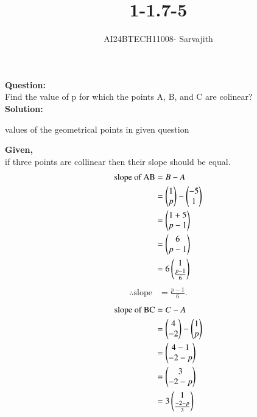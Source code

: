 \documentclass[journal]{IEEEtran}
\begin{document}

\vspace{3cm}

\title{1-1.7-5}
\author{AI24BTECH11008- Sarvajith
}
{\let\newpage\relax\maketitle}

\renewcommand{\thefigure}{\theenumi}
\renewcommand{\thetable}{\theenumi}
\setlength{\intextsep}{10pt} %
\renewcommand{\thetable}{\theenumi}
\textbf{Question: }\\
Find the value of p for which the points A, B, and C are colinear?\\
\textbf{Solution: }\\
\renewcommand{\tablename}{TABLE 1}
\begin{table}[h!]    
 \centering
  
  \caption{values of the geometrical points in given question}
  \label{tab1-1.2-18-1}
\end{table}
\textbf{Given,}\\
if three points are collinear then their slope should be equal.\\
\begin{align*}
   \text{slope of AB} &= B - A\\
	&=\begin{pmatrix}1\\p\end{pmatrix} - \begin{pmatrix}-5\\1\end{pmatrix}  \\
        &= \begin{pmatrix}1 + 5\\p-1\end{pmatrix}\\
        &= \begin{pmatrix}6\\p-1\end{pmatrix}\\
        &= 6\begin{pmatrix}1\\\frac{p-1}{6}\end{pmatrix}\\
    \end{align*}
    \begin{align}
        \therefore \text{slope} &= \frac{p-1}{6}. \label{eq 1-1.7-5-1}
    \end{align}
    \begin{align*}
	    \text{slope of BC} &= C - A\\ 
	    &=\begin{pmatrix}4\\-2\end{pmatrix} - \begin{pmatrix}1\\p\end{pmatrix} \\
         &= \begin{pmatrix}4-1\\-2-p\end{pmatrix}\\
         &= \begin{pmatrix}3\\-2-p\end{pmatrix}\\
         &= 3\begin{pmatrix}1\\\frac{-2-p}{3}\end{pmatrix}\\
    \end{align*}
\end{document}
